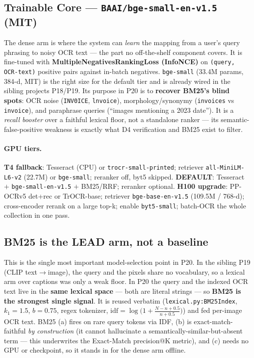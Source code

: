 \documentclass[12pt,a4paper]{article}
\begin{document}
\subsection{Trainable Core --- \texttt{BAAI/bge-small-en-v1.5} (MIT)}

The dense arm is where the system can \emph{learn} the mapping from a user's query phrasing to noisy OCR text --- the part no off-the-shelf component covers. It is fine-tuned with \textbf{MultipleNegativesRankingLoss (InfoNCE)} on \texttt{(query, OCR-text)} positive pairs against in-batch negatives. \texttt{bge-small} (33.4M params, 384-d, MIT) is the right size for the default tier and is already wired in the sibling projects P18/P19. Its purpose in P20 is to \textbf{recover BM25's blind spots}: OCR noise (\texttt{INV0ICE}, \texttt{lnvoice}), morphology/synonymy (\texttt{invoices} vs \texttt{invoice}), and paraphrase queries (``images mentioning a 2023 date''). It is a \emph{recall booster} over a faithful lexical floor, not a standalone ranker --- its semantic-false-positive weakness is exactly what D4 verification and BM25 exist to filter.

\paragraph{GPU tiers.} \textbf{T4 fallback}: Tesseract (CPU) or \texttt{trocr-small-printed}; retriever \texttt{all-MiniLM-L6-v2} (22.7M) or \texttt{bge-small}; reranker off, byt5 skipped. \textbf{DEFAULT}: Tesseract $+$ \texttt{bge-small-en-v1.5} $+$ BM25/RRF; reranker optional. \textbf{H100 upgrade}: PP-OCRv5 det+rec or TrOCR-base; retriever \texttt{bge-base-en-v1.5} (109.5M / 768-d); cross-encoder rerank on a large top-k; enable \texttt{byt5-small}; batch-OCR the whole collection in one pass.

\subsection{BM25 is the LEAD arm, not a baseline}

This is the single most important model-selection point in P20. In the sibling P19 (CLIP text$\rightarrow$image), the query and the pixels share no vocabulary, so a lexical arm over captions was only a weak floor. In P20 the query and the indexed OCR text live in the \textbf{same lexical space} --- both are literal strings --- so \textbf{BM25 is the strongest single signal}. It is reused verbatim (\texttt{lexical.py:BM25Index}, $k_1{=}1.5$, $b{=}0.75$, regex tokenizer, $\text{idf}=\log\!\big(1+\frac{N-n+0.5}{n+0.5}\big)$) and fed per-image OCR text. BM25 (a) fires on rare query tokens via IDF, (b) is exact-match-faithful \emph{by construction} (it cannot hallucinate a semantically-similar-but-absent term --- this underwrites the Exact-Match precision@K metric), and (c) needs no GPU or checkpoint, so it stands in for the dense arm offline.
\end{document}
